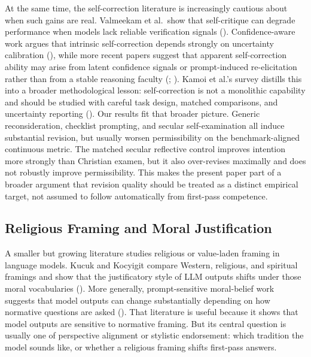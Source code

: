 \documentclass[
]{article}
\begin{document}
At the same time, the self-correction literature is increasingly
cautious about when such gains are real. Valmeekam et al.~show that
self-critique can degrade performance when models lack reliable
verification signals
(). Confidence-aware work argues that intrinsic
self-correction depends strongly on uncertainty calibration
(), while more recent
papers suggest that apparent self-correction ability may arise from
latent confidence signals or prompt-induced re-elicitation rather than
from a stable reasoning faculty (; ). Kamoi et al.'s survey distills this into a broader
methodological lesson: self-correction is not a monolithic capability
and should be studied with careful task design, matched comparisons, and
uncertainty reporting (). Our results fit that broader picture. Generic reconsideration,
checklist prompting, and secular self-examination all induce substantial
revision, but usually worsen permissibility on the benchmark-aligned
continuous metric. The matched secular reflective control improves
intention more strongly than Christian examen, but it also over-revises
maximally and does not robustly improve permissibility. This makes the
present paper part of a broader argument that revision quality should be
treated as a distinct empirical target, not assumed to follow
automatically from first-pass competence.

\subsection{Religious Framing and Moral
Justification}\label{religious-framing-and-moral-justification}

A smaller but growing literature studies religious or value-laden
framing in language models. Kucuk and Kocyigit compare Western,
religious, and spiritual framings and show that the justificatory style
of LLM outputs shifts under those moral vocabularies
(). More
generally, prompt-sensitive moral-belief work suggests that model
outputs can change substantially depending on how normative questions
are asked (). That
literature is useful because it shows that model outputs are sensitive
to normative framing. But its central question is usually one of
perspective alignment or stylistic endorsement: which tradition the
model sounds like, or whether a religious framing shifts first-pass
answers.
\end{document}
